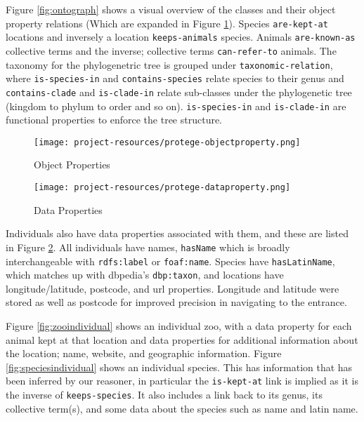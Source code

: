 \documentclass[a4paper]{article}
\begin{document}
Figure \ref{fig:ontograph} shows a visual overview of the classes and their object property relations (Which are expanded in Figure \ref{fig:objectproperties}). Species \texttt{are-kept-at} locations and inversely a location \texttt{keeps-animals} species. Animals \texttt{are-known-as} collective terms and the inverse; collective terms \texttt{can-refer-to} animals. The taxonomy for the phylogenetric tree is grouped under \texttt{taxonomic-relation}, where \texttt{is-species-in} and \texttt{contains-species} relate species to their genus and \texttt{contains-clade} and \texttt{is-clade-in} relate sub-classes under the phylogenetic tree (kingdom to phylum to order and so on). \texttt{is-species-in} and \texttt{is-clade-in} are functional properties to enforce the tree structure.

\begin{figure}[h!]
	\centering
	\texttt{[image: project-resources/protege-objectproperty.png]}
	\caption{Object Properties}
	\label{fig:objectproperties}
\end{figure}

\begin{figure}[h!]
	\centering
	\texttt{[image: project-resources/protege-dataproperty.png]}
	\caption{Data Properties}
	\label{fig:dataproperties}
\end{figure}

Individuals also have data properties associated with them, and these are listed in Figure \ref{fig:dataproperties}. All individuals have names, \texttt{hasName} which is broadly interchangeable with \texttt{rdfs:label} or \texttt{foaf:name}. Species have \texttt{hasLatinName}, which matches up with dbpedia's \texttt{dbp:taxon}, and locations have longitude/latitude, postcode, and url properties. Longitude and latitude were stored as well as postcode for improved precision in navigating to the entrance.

Figure \ref{fig:zooindividual} shows an individual zoo, with a data property for each animal kept at that location and data properties for additional information about the location; name, website, and geographic information. Figure \ref{fig:speciesindividual} shows an individual species. This has information that has been inferred by our reasoner, in particular the \texttt{is-kept-at} link is implied as it is the inverse of \texttt{keeps-species}. It also includes a link back to its genus, its collective term(s), and some data about the species such as name and latin name.
\end{document}

